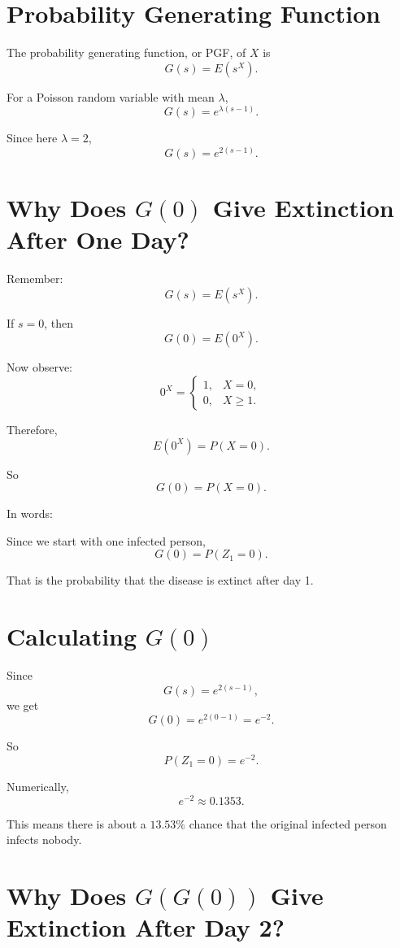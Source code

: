 \documentclass[12pt]{article}
\begin{document}
\section{Probability Generating Function}

The probability generating function, or PGF, of \(X\) is
\[
G(s)=E(s^X).
\]

For a Poisson random variable with mean \(\lambda\),
\[
G(s)=e^{\lambda(s-1)}.
\]

Since here \(\lambda=2\),
\[
G(s)=e^{2(s-1)}.
\]

\section{Why Does \(G(0)\) Give Extinction After One Day?}

Remember:
\[
G(s)=E(s^X).
\]

If \(s=0\), then
\[
G(0)=E(0^X).
\]

Now observe:
\[
0^X=
\begin{cases}
1, & X=0,\\
0, & X\geq 1.
\end{cases}
\]

Therefore,
\[
E(0^X)=P(X=0).
\]

So
\[
G(0)=P(X=0).
\]

In words:

\begin{center}
\end{center}

Since we start with one infected person,
\[
G(0)=P(Z_1=0).
\]

That is the probability that the disease is extinct after day 1.

\section{Calculating \(G(0)\)}

Since
\[
G(s)=e^{2(s-1)},
\]
we get
\[
G(0)=e^{2(0-1)}=e^{-2}.
\]

So
\[
P(Z_1=0)=e^{-2}.
\]

Numerically,
\[
e^{-2}\approx 0.1353.
\]

This means there is about a \(13.53\%\) chance that the original infected person infects nobody.

\section{Why Does \(G(G(0))\) Give Extinction After Day 2?}
\end{document}
